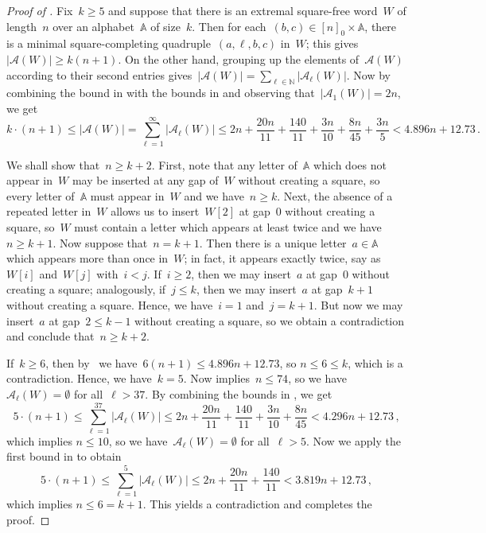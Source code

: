 \documentclass[12pt]{article}
\theoremstyle{plain}
\theoremstyle{definition}
\newcommand\N{\mathbb{N}}
\newcommand{\A}{\mathbb A}
\newcommand{\cA}{\mathcal A}
\newcommand{\abs}[1]{\mathopen{}\left\lvert#1\right\rvert\mathclose{}}
\begin{document}
	\begin{proof}[Proof of ]
		Fix~$k\ge5$ and suppose that there is an extremal square-free word~$W$ of length~$n$ over an alphabet~$\A$ of size~$k$. Then for each~$(b,c)\in[n]_0\times\A$, there is a minimal square-completing quadruple~$(a,\ell,b,c)$ in~$W$; this gives~$\abs{\cA(W)}\ge k(n+1)$. On the other hand, grouping up the elements of~$\cA(W)$ according to their second entries gives~$\abs{\cA(W)}=\sum_{\ell\in\N}\abs{\cA_{\ell}(W)}$. Now by combining the bound in  with the bounds in  and observing that~$\abs{\cA_1(W)}=2n$, we get
		\begin{equation} \label{eq:mscq-collection-bounds}
			k\cdot(n+1)\le\abs{\cA(W)}=\sum_{\ell=1}^{\infty}\abs{\cA_{\ell}(W)} \le 2n + \frac{20n}{11}+\frac{140}{11} + \frac{3n}{10} + \frac{8n}{45} + \frac{3n}{5} < 4.896n + 12.73\,.
		\end{equation}
		
		We shall show that~$n\ge k+2$. First, note that any letter of~$\A$ which does not appear in~$W$ may be inserted at any gap of~$W$ without creating a square, so every letter of~$\A$ must appear in~$W$ and we have~$n\ge k$. Next, the absence of a repeated letter in~$W$ allows us to insert~$W[2]$ at gap~$0$ without creating a square, so~$W$ must contain a letter which appears at least twice and we have~$n\ge k+1$. Now suppose that~$n=k+1$. Then there is a unique letter~$a\in\A$ which appears more than once in~$W$; in fact, it appears exactly twice, say as~$W[i]$ and~$W[j]$ with~$i<j$. If~$i\ge2$, then we may insert~$a$ at gap~$0$ without creating a square; analogously, if~$j\le k$, then we may insert~$a$ at gap~$k+1$ without creating a square. Hence, we have~$i=1$ and~$j=k+1$. But now we may insert~$a$ at gap~$2\le k-1$ without creating a square, so we obtain a contradiction and conclude that~$n\ge k+2$.
		
		If~$k\ge6$, then by~ we have~$6(n+1)\le 4.896n+12.73$, so $n\le 6\le k$, which is a contradiction. Hence, we have~$k=5$. Now  implies~$n\le74$, so we have~$\cA_\ell(W)=\emptyset$ for all~$\ell>37$. By combining the bounds in , we get
		\[5\cdot(n+1)\le\sum_{\ell=1}^{37}\abs{\cA_\ell(W)} \le 2n + \frac{20n}{11} + \frac{140}{11} + \frac{3n}{10} + \frac{8n}{45} < 4.296n + 12.73\,,\]
		which implies $n\le 10$, so we have~$\cA_\ell(W)=\emptyset$ for all~$\ell>5$. Now we apply the first bound in  to obtain
		\[5\cdot(n+1)\le\sum_{\ell=1}^{5}\abs{\cA_\ell(W)} \le 2n + \frac{20n}{11} + \frac{140}{11} < 3.819n + 12.73\,,\]
		which implies $n\le 6 = k+1$. This yields a contradiction and completes the proof.
	\end{proof}
	
\end{document}

